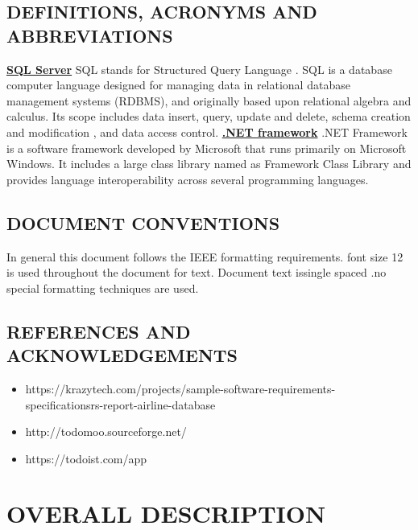 \documentclass[12pt, a4paper]{report}
\begin{document}
\section{DEFINITIONS, ACRONYMS AND ABBREVIATIONS}
\textbf{\underline{SQL Server}} \newline \newline SQL stands for Structured Query Language . SQL is a database computer language designed for managing data in relational database management systems (RDBMS), and originally based upon relational algebra and calculus. Its scope includes data insert, query, update and delete, schema creation and modification , and data access control. \newline \textbf{\underline{.NET framework}} \newline \newline .NET Framework  is a software framework developed by Microsoft that runs primarily on Microsoft Windows. It includes a large class library named as Framework Class Library and provides language interoperability across several programming languages.
\section{DOCUMENT CONVENTIONS}
In general this document follows the IEEE formatting requirements. font size 12 is used throughout the document for text. Document text issingle spaced .no special formatting techniques are used.
\section{REFERENCES AND ACKNOWLEDGEMENTS }
\begin{itemize}
	\item https://krazytech.com/projects/sample-software-requirements-specificationsrs-report-airline-database
	\item http://todomoo.sourceforge.net/
	\item https://todoist.com/app
\end{itemize}

\newpage \chapter{OVERALL DESCRIPTION}
\end{document}

